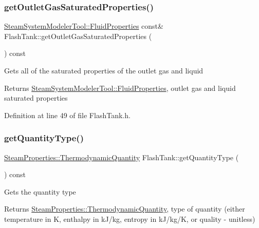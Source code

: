 \mbox{\label{class_flash_tank_a9db00130ed4419e2e251c9e5ce936572}} 
\subsubsection{\texorpdfstring{get\+Outlet\+Gas\+Saturated\+Properties()}{getOutletGasSaturatedProperties()}}
{\footnotesize\ttfamily \hyperlink{struct_steam_system_modeler_tool_1_1_fluid_properties}{Steam\+System\+Modeler\+Tool\+::\+Fluid\+Properties} const\& Flash\+Tank\+::get\+Outlet\+Gas\+Saturated\+Properties (\begin{DoxyParamCaption}{ }\end{DoxyParamCaption}) const\hspace{0.3cm}{\ttfamily [inline]}}

Gets all of the saturated properties of the outlet gas and liquid \begin{DoxyReturn}{Returns}
\hyperlink{struct_steam_system_modeler_tool_1_1_fluid_properties}{Steam\+System\+Modeler\+Tool\+::\+Fluid\+Properties}, outlet gas and liquid saturated properties 
\end{DoxyReturn}


Definition at line 49 of file Flash\+Tank.\+h.

\mbox{\label{class_flash_tank_a1800317a9b9dd8ff8fb18c693e846a45}} 
\subsubsection{\texorpdfstring{get\+Quantity\+Type()}{getQuantityType()}}
{\footnotesize\ttfamily \hyperlink{class_steam_properties_ae0294bedf7d178c2d8fb6aed0f62fbff}{Steam\+Properties\+::\+Thermodynamic\+Quantity} Flash\+Tank\+::get\+Quantity\+Type (\begin{DoxyParamCaption}{ }\end{DoxyParamCaption}) const}

Gets the quantity type \begin{DoxyReturn}{Returns}
\hyperlink{class_steam_properties_ae0294bedf7d178c2d8fb6aed0f62fbff}{Steam\+Properties\+::\+Thermodynamic\+Quantity}, type of quantity (either temperature in K, enthalpy in k\+J/kg, entropy in k\+J/kg/K, or quality -\/ unitless) 
\end{DoxyReturn}


